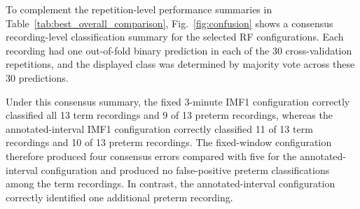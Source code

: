 \documentclass[10pt,letterpaper]{article}
\begin{document}
\begin{table}[!htbp]
\centering
\caption{\textbf{Exploratory best-observed recording-level performance across segmentation strategies and signal representations.} For each configuration, the classifier with the highest mean balanced accuracy was retained. Values are means across 30 complete repetition-level out-of-fold evaluations. Model, representation, and segmentation comparisons were performed within the same dataset and should therefore be interpreted as exploratory. Preterm delivery was treated as the positive class.}
\label{tab:best_overall_comparison}
\end{table}
\FloatBarrier

To complement the repetition-level performance summaries in
Table~\ref{tab:best_overall_comparison}, Fig.~\ref{fig:confusion} shows a
consensus recording-level classification summary for the selected RF
configurations. Each recording had one out-of-fold binary prediction in
each of the 30 cross-validation repetitions, and the displayed class was
determined by majority vote across these 30 predictions.

Under this consensus summary, the fixed 3-minute IMF1 configuration
correctly classified all 13 term recordings and 9 of 13 preterm recordings,
whereas the annotated-interval IMF1 configuration correctly classified
11 of 13 term recordings and 10 of 13 preterm recordings. The fixed-window
configuration therefore produced four consensus errors compared with five
for the annotated-interval configuration and produced no false-positive
preterm classifications among the term recordings. In contrast, the
annotated-interval configuration correctly identified one additional
preterm recording.
\end{document}
